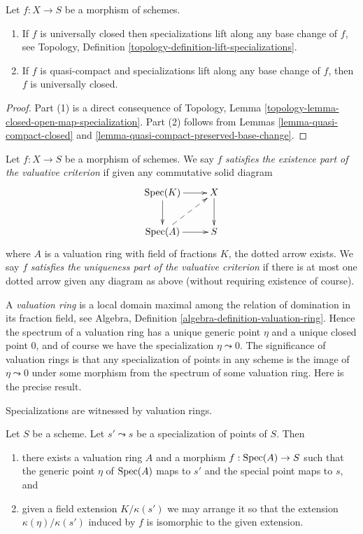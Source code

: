 \begin{lemma}
\label{lemma-specializations-lift}
Let $f : X \to S$ be a morphism of schemes.
\begin{enumerate}
\item If $f$ is universally closed then specializations lift
along any base change of $f$, see
Topology, Definition \ref{topology-definition-lift-specializations}.
\item If $f$ is quasi-compact and specializations lift
along any base change of $f$, then $f$ is universally closed.
\end{enumerate}
\end{lemma}

\begin{proof}
Part (1) is a direct consequence of
Topology, Lemma \ref{topology-lemma-closed-open-map-specialization}.
Part (2) follows from
Lemmas \ref{lemma-quasi-compact-closed} and
\ref{lemma-quasi-compact-preserved-base-change}.
\end{proof}

\begin{definition}
\label{definition-valuative-criterion}
Let $f : X \to S$ be a morphism of schemes. We say $f$
{\it satisfies the existence part of the valuative criterion}
if given any commutative solid diagram
$$
\xymatrix{
\Spec(K) \ar[r] \ar[d] & X \ar[d] \\
\Spec(A) \ar[r] \ar@{-->}[ru] & S
}
$$
where $A$ is a valuation ring with field of fractions $K$, the
dotted arrow exists. We say $f$ {\it satisfies the uniqueness
part of the valuative criterion} if there is at most one
dotted arrow given any diagram as above (without requiring
existence of course).
\end{definition}

\noindent
A {\it valuation ring} is a local domain maximal among the relation
of domination in its fraction field, see
Algebra, Definition \ref{algebra-definition-valuation-ring}.
Hence the spectrum of a valuation ring has a unique generic point
$\eta$ and a unique closed point $0$, and of course we have the
specialization $\eta \leadsto 0$.
The significance of valuation rings is that any specialization of
points in any scheme is the image of $\eta \leadsto 0$
under some morphism from the spectrum of some valuation ring.
Here is the precise result.

\begin{lemma}
\label{lemma-points-specialize}
\begin{slogan}
Specializations are witnessed by valuation rings.
\end{slogan}
Let $S$ be a scheme. Let $s' \leadsto s$ be a specialization of points of $S$.
Then
\begin{enumerate}
\item there exists a valuation ring $A$ and a morphism
$f : \mathop{\mathrm{Spec}}(A) \to S$ such that the generic point $\eta$ of
$\mathop{\mathrm{Spec}}(A)$ maps to $s'$ and the special point maps to $s$, and
\item given a field extension $K/\kappa(s')$
we may arrange it so that the extension
$\kappa(\eta)/\kappa(s')$ induced by $f$
is isomorphic to the given extension.
\end{enumerate}
\end{lemma}

